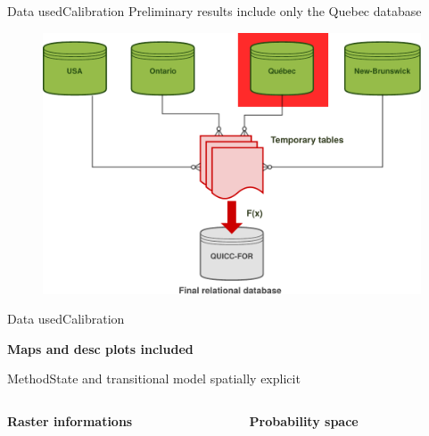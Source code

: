 \documentclass[10pt,aspectratio=149]{beamer}
\begin{document}

\begin{frame}[t]{Data used}{Calibration}
	\center Preliminary results include only the Quebec database
\begin{figure}
	\includegraphics[width=.60\paperwidth]{Figs/quiccfor2.pdf}
\end{figure}

\end{frame}



\begin{frame}[t]{Data used}{Calibration}
	
	\textbf{Maps and desc plots included}

\end{frame}


\begin{frame}{Method}{State and transitional model spatially explicit}

\begin{columns}[c]
	\begin{column}[c]{.40\paperwidth}

	\textbf{Raster informations}

	\end{column}
	\begin{column}[c]{.40\paperwidth}
		
	\textbf{Probability space}

	\end{column}
\end{columns}

\end{frame}
\end{document}
